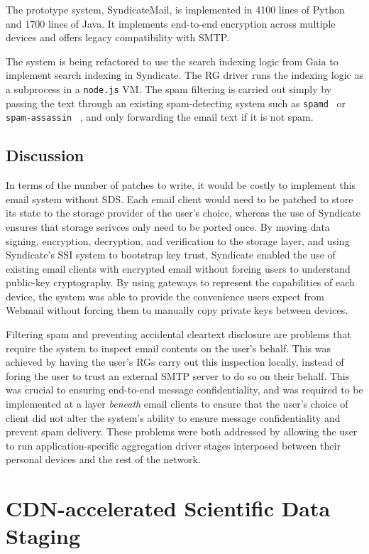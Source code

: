 The prototype system, SyndicateMail, is implemented in 4100 lines of Python and
1700 lines of Java.  It implements end-to-end encryption across multiple devices
and offers legacy compatibility with SMTP.

The system is being refactored to use the search indexing
logic from Gaia to implement search indexing in Syndicate.  The RG
driver runs the indexing logic as a subprocess in a \texttt{node.js} VM.  The
spam filtering is carried out simply by passing the text through an existing
spam-detecting system such as \texttt{spamd}~\cite{spamd} or \texttt{spam-assassin}
~\cite{spam-assassin}, and only forwarding the email text if it is not spam.

\subsection{Discussion}

In terms of the number of patches to write, it would be costly to implement this email system without
SDS.  Each email client would need to be patched to store its state to the
storage provider of the user's choice, whereas the use of Syndicate ensures that
storage serivces only need to be ported once.  By moving data signing,
encryption, decryption, and verification to the storage layer, 
and using Syndicate's SSI system to bootstrap key trust, Syndicate enabled the
use of existing email clients with encrypted email without forcing
users to understand public-key cryptography.  By using gateways to represent the
capabilities of each device, the system was able to provide the convenience users expect from Webmail
without forcing them to manually copy private keys between devices.

Filtering spam and preventing accidental cleartext disclosure are problems
that require the system to inspect email contents on the user's behalf.  This
was achieved by having the user's RGs carry out this inspection locally,
instead of foring the user to trust an external SMTP server to do so on their
behalf.  This was crucial to ensuring end-to-end message confidentiality, and
was required to be implemented at a layer \emph{beneath} email clients to ensure
that the user's choice of client did not alter the system's ability to ensure
message confidentiality and prevent spam delivery.  These problems
were both addressed by allowing the user to run application-specific aggregation driver
stages interposed between their personal devices and the rest of the network.

\section{CDN-accelerated Scientific Data Staging}


